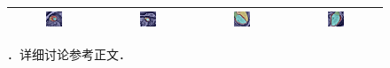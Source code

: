 \begin{figure}
\begin{center}
\begin{tabular}{cccc}
\includegraphics[width=0.19\textwidth]{./data/failures/HCMNet_2000062/00_SAX/9/9_gt.png} &
\includegraphics[width=0.19\textwidth]{./data/failures/HCMNet_2400044/00_SAX/2/5_gt.png} &
\includegraphics[width=0.19\textwidth]{./data/failures/HCMNet_2600079/01_HLA/00/0_gt.png} &
\includegraphics[width=0.19\textwidth]{./data/failures/HCMNet_2600079/02_VLA/00/0_gt.png} \\
\bottomrule

\end{tabular}

\caption[\captiontitle]{\captiontitle{}．详细讨论参考正文．}
\label{fig:failure}
\end{center}
\end{figure}
